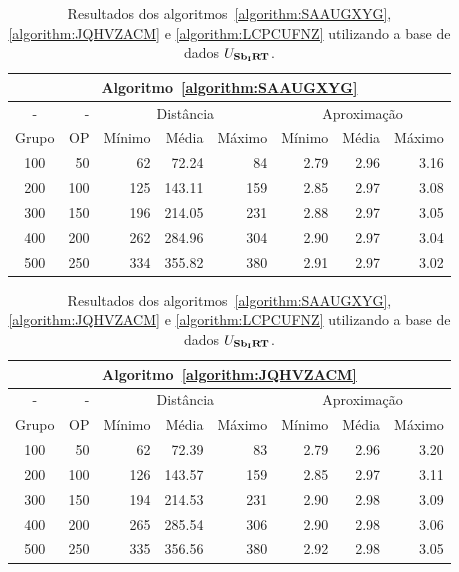 \begin{table}[!htb]
  \caption{Resultados dos algoritmos~\ref{algorithm:SAAUGXYG}, \ref{algorithm:JQHVZACM} e \ref{algorithm:LCPCUFNZ} utilizando a base de dados $U_{\textbf{Sb\textsubscript{I}RT}}{}$.}
  \label{table:WFTACOYR}
  \centering
  \begin{tabular}{|c|r|r|r|r|r|r|r|}
    \hline
    \multicolumn{8}{|c|}{Algoritmo~\ref{algorithm:SAAUGXYG}}                                                  \\ \hline
      -      &  -   & \multicolumn{3}{c|}{Distância}             & \multicolumn{3}{c|}{Aproximação}           \\ \hline
    Grupo    & OP   & Mínimo       & Média        & Máximo       & Mínimo       & Média        & Máximo       \\ \hline  
    100      & 50   & 62           &  72.24       & 84           & 2.79         & 2.96         & 3.16         \\ \hline
    200      & 100  & 125          & 143.11       & 159          & 2.85         & 2.97         & 3.08         \\ \hline
    300      & 150  & 196          & 214.05       & 231          & 2.88         & 2.97         & 3.05         \\ \hline
    400      & 200  & 262          & 284.96       & 304          & 2.90         & 2.97         & 3.04         \\ \hline
    500      & 250  & 334          & 355.82       & 380          & 2.91         & 2.97         & 3.02         \\ \hline    
  \end{tabular}

  \vspace{5mm}

  \begin{tabular}{|c|r|r|r|r|r|r|r|}
    \hline
    \multicolumn{8}{|c|}{Algoritmo~\ref{algorithm:JQHVZACM}}                                                  \\ \hline
      -      &  -   & \multicolumn{3}{c|}{Distância}             & \multicolumn{3}{c|}{Aproximação}           \\ \hline
    Grupo    & OP   & Mínimo       & Média        & Máximo       & Mínimo       & Média        & Máximo       \\ \hline  
    100      & 50   & 62           &  72.39       &  83          & 2.79         & 2.96         & 3.20         \\ \hline
    200      & 100  & 126          & 143.57       & 159          & 2.85         & 2.97         & 3.11         \\ \hline
    300      & 150  & 194          & 214.53       & 231          & 2.90         & 2.98         & 3.09         \\ \hline
    400      & 200  & 265          & 285.54       & 306          & 2.90         & 2.98         & 3.06         \\ \hline
    500      & 250  & 335          & 356.56       & 380          & 2.92         & 2.98         & 3.05         \\ \hline    
  \end{tabular}


\end{table}
